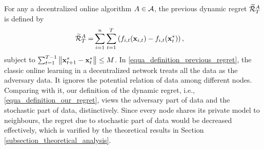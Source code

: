 \documentclass{article}
\begin{document}
For any a decentralized online algorithm $A \in {\mathcal{A}}$, the previous dynamic regret  $\widetilde{{\mathcal{R}}}_T^{A}$ is defined by
\begin{align}
\label{equa_definition_previous_regret}
\widetilde{{\mathcal{R}}}_T^{A} = &  \sum_{i=1}^n\sum_{t=1}^T \left(  f_{i,t}({\bf x}_{i,t}) - f_{i,t}({\bf x}_t^\ast)  \right),
\end{align} subject to $\sum_{t=1}^{T-1} \left\lVert{\bf x}_{t+1}^\ast - {\bf x}_t^\ast\right\rVert \le M$.  In \eqref{equa_definition_previous_regret}, the classic online learning in a decentralized network treats all the data as the adversary data. It ignores the potential relation of data among different nodes. Comparing with it, our definition of the dynamic regret, i.e., \eqref{equa_definition_our_regret}, views the adversary part of data and the stochastic part of data, distinctively.  Since every node shares its private model to neighbours, the regret due to stochastic part of data would be decreased effectively, which is varified by the theoretical results in Section \ref{subsection_theoretical_analysis}.
\end{document}
